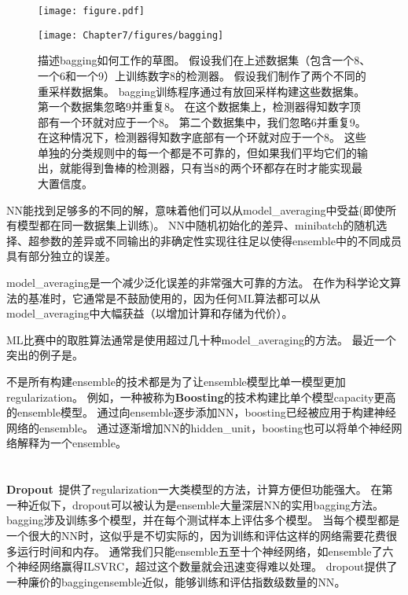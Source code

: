 \begin{figure}[!htb]
\ifOpenSource
\centerline{\texttt{[image: figure.pdf]}}
\else
\centerline{\texttt{[image: Chapter7/figures/bagging]}}
\fi
\caption{描述\gls{bagging}如何工作的草图。
假设我们在上述数据集（包含一个8、一个6和一个9）上训练数字8的检测器。
假设我们制作了两个不同的重采样数据集。
\gls{bagging}训练程序通过有放回采样构建这些数据集。
第一个数据集忽略9并重复8。
在这个数据集上，检测器得知数字顶部有一个环就对应于一个8。
第二个数据集中，我们忽略6并重复9。
在这种情况下，检测器得知数字底部有一个环就对应于一个8。
这些单独的分类规则中的每一个都是不可靠的，但如果我们平均它们的输出，就能得到鲁棒的检测器，只有当8的两个环都存在时才能实现最大置信度。
}
\label{fig:chap7_bagging}
\end{figure}

\gls{NN}能找到足够多的不同的解，意味着他们可以从\gls{model_averaging}中受益(即使所有模型都在同一数据集上训练)。
\gls{NN}中随机初始化的差异、\gls{minibatch}的随机选择、超参数的差异或不同输出的非确定性实现往往足以使得\gls{ensemble}中的不同成员具有部分独立的误差。


\gls{model_averaging}是一个减少泛化误差的非常强大可靠的方法。
在作为科学论文算法的基准时，它通常是不鼓励使用的，因为任何\gls{ML}算法都可以从\gls{model_averaging}中大幅获益（以增加计算和存储为代价）。

\gls{ML}比赛中的取胜算法通常是使用超过几十种\gls{model_averaging}的方法。
最近一个突出的例子是\citep{Koren09}。

不是所有构建\gls{ensemble}的技术都是为了让\gls{ensemble}模型比单一模型更加\gls{regularization}。
例如，一种被称为\textbf{Boosting}的技术\citep{ConfLT:Freund:gametheorie,ConfML:Freund:AdaBoostCompar}构建比单个模型\gls{capacity}更高的\gls{ensemble}模型。
通过向\gls{ensemble}逐步添加\gls{NN}，\gls{boosting}已经被应用于构建神经网络的\gls{ensemble}\citep{nips-10:Holger+Yoshua:1998}。
通过逐渐增加\gls{NN}的\gls{hidden_unit}，\gls{boosting}也可以将单个神经网络解释为一个\gls{ensemble}。

\section{}
\label{sec:dropout}
\textbf{Dropout}~\citep{Srivastava14}提供了\gls{regularization}一大类模型的方法，计算方便但功能强大。
在第一种近似下，\gls{dropout}可以被认为是\gls{ensemble}大量深层\gls{NN}的实用\gls{bagging}方法。
\gls{bagging}涉及训练多个模型，并在每个测试样本上评估多个模型。
当每个模型都是一个很大的\gls{NN}时，这似乎是不切实际的，因为训练和评估这样的网络需要花费很多运行时间和内存。
通常我们只能\gls{ensemble}五至十个神经网络，如\cite{Szegedy-et-al-arxiv2014}\gls{ensemble}了六个神经网络赢得ILSVRC，超过这个数量就会迅速变得难以处理。
\gls{dropout}提供了一种廉价的\gls{bagging}\gls{ensemble}近似，能够训练和评估指数级数量的\gls{NN}。

